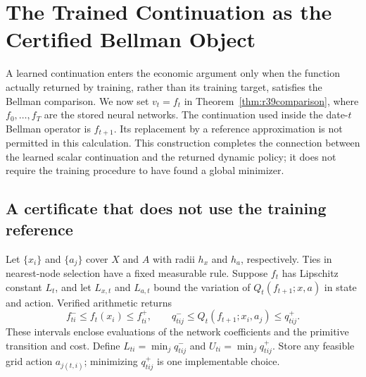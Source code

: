 \documentclass[ecta,nameyear,draft]{econsocart}
\theoremstyle{definition}
\theoremstyle{remark}
\begin{document}
\section{The Trained Continuation as the Certified Bellman Object}
\label{sec:r41direct}
A learned continuation enters the economic argument only when the function
actually returned by training, rather than its training target, satisfies the
Bellman comparison. We now set $v_t=f_t$ in
Theorem~\ref{thm:r39comparison}, where $f_0,\ldots,f_T$ are the stored neural
networks. The continuation used inside the date-$t$ Bellman operator is
$f_{t+1}$. Its replacement by a reference approximation is not permitted in
this calculation. This construction completes the connection between the
learned scalar continuation and the returned dynamic policy; it does not
require the training procedure to have found a global minimizer.

\subsection{A certificate that does not use the training reference}
Let $\{x_i\}$ and $\{a_j\}$ cover $X$ and $A$ with radii $h_x$ and $h_a$,
respectively. Ties in nearest-node selection have a fixed measurable rule.
Suppose $f_t$ has Lipschitz constant $L_t$, and let $L_{x,t}$ and $L_{a,t}$
bound the variation of $Q_t(f_{t+1};x,a)$ in state and action. Verified
arithmetic returns
\[
 f^-_{ti}\leq f_t(x_i)\leq f^+_{ti},\qquad
 q^-_{tij}\leq Q_t(f_{t+1};x_i,a_j)\leq q^+_{tij}.
\]
These intervals enclose evaluations of the network coefficients and the
primitive transition and cost. Define $L_{ti}=\min_jq^-_{tij}$ and
$U_{ti}=\min_jq^+_{tij}$. Store any feasible grid action $a_{j(t,i)}$;
minimizing $q^+_{tij}$ is one implementable choice.
\end{document}
